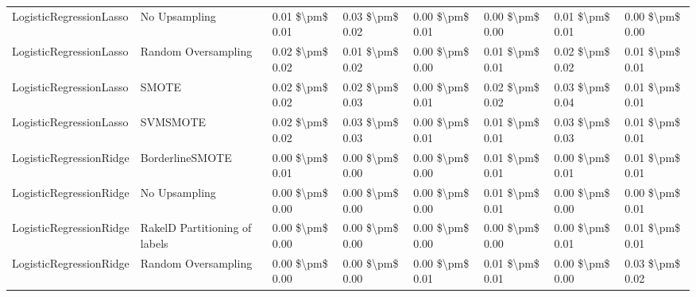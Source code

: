 \begin{tabular}{llllllll}
        LogisticRegressionLasso &                 No Upsampling & 0.01 \$\textbackslash pm\$ 0.01 &           0.03 \$\textbackslash pm\$ 0.02 &       0.00 \$\textbackslash pm\$ 0.01 &        0.00 \$\textbackslash pm\$ 0.00 &                         0.01 \$\textbackslash pm\$ 0.01 &     0.00 \$\textbackslash pm\$ 0.00 \\
        LogisticRegressionLasso &           Random Oversampling & 0.02 \$\textbackslash pm\$ 0.02 &           0.01 \$\textbackslash pm\$ 0.02 &       0.00 \$\textbackslash pm\$ 0.00 &        0.01 \$\textbackslash pm\$ 0.01 &                         0.02 \$\textbackslash pm\$ 0.02 &     0.01 \$\textbackslash pm\$ 0.01 \\
        LogisticRegressionLasso &                         SMOTE & 0.02 \$\textbackslash pm\$ 0.02 &           0.02 \$\textbackslash pm\$ 0.03 &       0.00 \$\textbackslash pm\$ 0.01 &        0.02 \$\textbackslash pm\$ 0.02 &                         0.03 \$\textbackslash pm\$ 0.04 &     0.01 \$\textbackslash pm\$ 0.01 \\
        LogisticRegressionLasso &                      SVMSMOTE & 0.02 \$\textbackslash pm\$ 0.02 &           0.03 \$\textbackslash pm\$ 0.03 &       0.00 \$\textbackslash pm\$ 0.01 &        0.01 \$\textbackslash pm\$ 0.01 &                         0.03 \$\textbackslash pm\$ 0.03 &     0.01 \$\textbackslash pm\$ 0.01 \\
        LogisticRegressionRidge &               BorderlineSMOTE & 0.00 \$\textbackslash pm\$ 0.01 &           0.00 \$\textbackslash pm\$ 0.00 &       0.00 \$\textbackslash pm\$ 0.00 &        0.01 \$\textbackslash pm\$ 0.01 &                         0.00 \$\textbackslash pm\$ 0.01 &     0.01 \$\textbackslash pm\$ 0.01 \\
        LogisticRegressionRidge &                 No Upsampling & 0.00 \$\textbackslash pm\$ 0.00 &           0.00 \$\textbackslash pm\$ 0.00 &       0.00 \$\textbackslash pm\$ 0.00 &        0.01 \$\textbackslash pm\$ 0.01 &                         0.00 \$\textbackslash pm\$ 0.00 &     0.00 \$\textbackslash pm\$ 0.01 \\
        LogisticRegressionRidge & RakelD Partitioning of labels & 0.00 \$\textbackslash pm\$ 0.00 &           0.00 \$\textbackslash pm\$ 0.00 &       0.00 \$\textbackslash pm\$ 0.00 &        0.00 \$\textbackslash pm\$ 0.00 &                         0.00 \$\textbackslash pm\$ 0.01 &     0.01 \$\textbackslash pm\$ 0.01 \\
        LogisticRegressionRidge &           Random Oversampling & 0.00 \$\textbackslash pm\$ 0.00 &           0.00 \$\textbackslash pm\$ 0.00 &       0.00 \$\textbackslash pm\$ 0.01 &        0.01 \$\textbackslash pm\$ 0.01 &                         0.00 \$\textbackslash pm\$ 0.00 &     0.03 \$\textbackslash pm\$ 0.02 \\

\end{tabular}
